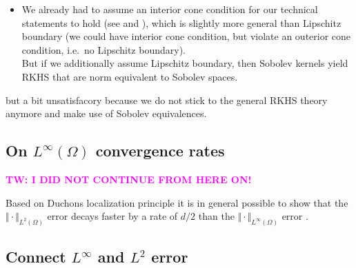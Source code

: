 \documentclass[a4paper, 10pt]{article}
\newcommand{\tw}[1]{\textcolor{magenta}{TW: #1}}
\begin{document}
\begin{itemize}
\begin{itemize}
Using the same approach and theory above, we can show that a sufficient fast approximability of $f$ results in $f \in H^{\tilde{\tau}}$ for $\tau < \tilde{\tau} < 2\tau$.
This statement then still reveals the smoothness of $f$, but no longer the boundary conditions (which are anyway unclear). \\
The nice part is, that $f \in H^{\tilde{\tau}}$ for $\tau < \tilde{\tau} < 2\tau$ has some classical Sobolev smoothness which directly translates to $\vartheta < 1$ power spaces smoothness of $k_2$, but to not necessarily to $\vartheta > 1$ power space smoothness of $k$ (because there also boundary conditions contribute).
\item We already had to assume an interior cone condition for our technical statements to hold (see  and ),
 which is slightly more general than Lipschitz boundary (we could have interior cone condition, but violate an outerior cone condition, i.e.\ no Lipschitz boundary). \\
But if we additionally assume Lipschitz boundary, then Sobolev kernels yield RKHS that are norm equivalent to Sobolev spaces.
\end{itemize}
but a bit unsatisfacory because we do not stick to the general RKHS theory anymore and make use of Sobolev equivalences.
\end{itemize}


\subsection{On $L^\infty(\Omega)$ convergence rates}
\label{subsec:L2_conv_rates_sharp}

\begin{center}
\textbf{\textcolor{red}{\tw{I DID NOT CONTINUE FROM HERE ON!}}}
\end{center}

Based on Duchons localization principle \cite{duchon1978erreur} it is in general possible to show that the $\Vert \cdot \Vert_{L^2(\Omega)}$ error decays faster by a rate of $d/2$ than the $\Vert \cdot \Vert_{L^\infty(\Omega)}$ error \cite{light1998power, wendland1997sobolev}. \\

\subsection{Connect $L^\infty$ and $L^2$ error}
\label{subsec:connect_Linfty_L2}
\end{document}
